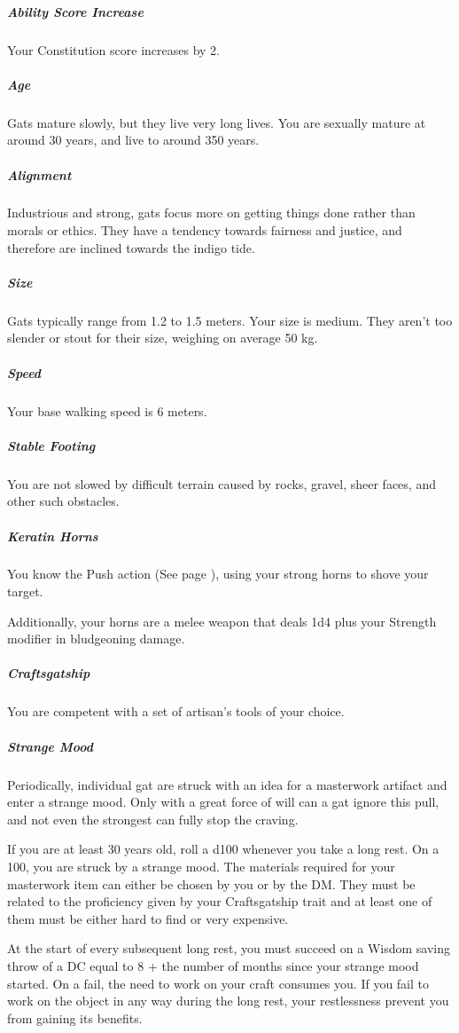     \subparagraph{Ability Score Increase} Your Constitution score increases by 2.

    \subparagraph{Age} Gats mature slowly, but they live very long lives.
    You are sexually mature at around 30 years, and live to around 350 years.

    \subparagraph{Alignment} Industrious and strong, gats focus more on getting things done rather than morals or ethics.
    They have a tendency towards fairness and justice, and therefore are inclined towards the indigo tide.

    \subparagraph{Size} Gats typically range from 1.2 to 1.5 meters.
    Your size is medium.
    They aren't too slender or stout for their size, weighing on average 50 kg.

    \subparagraph{Speed} Your base walking speed is 6 meters.

    \subparagraph{Stable Footing} You are not slowed by difficult terrain caused by rocks, gravel, sheer faces, and other such obstacles.

    \subparagraph{Keratin Horns} You know the Push action (See page \pageref{act::push}), using your strong horns to shove your target.

    Additionally, your horns are a melee weapon that deals 1d4 plus your Strength modifier in bludgeoning damage.

    \subparagraph{Craftsgatship} You are competent with a set of artisan's tools of your choice.

    \subparagraph{Strange Mood} Periodically, individual gat are struck with an idea for a masterwork artifact and enter a strange mood.
    Only with a great force of will can a gat ignore this pull, and not even the strongest can fully stop the craving.

    If you are at least 30 years old, roll a d100 whenever you take a long rest.
    On a 100, you are struck by a strange mood.
    The materials required for your masterwork item can either be chosen by you or by the DM.
    They must be related to the proficiency given by your Craftsgatship trait and at least one of them must be either hard to find or very expensive.

    At the start of every subsequent long rest, you must succeed on a Wisdom saving throw of a DC equal to 8 + the number of months since your strange mood started.
    On a fail, the need to work on your craft consumes you.
    If you fail to work on the object in any way during the long rest, your restlessness prevent you from gaining its benefits.

